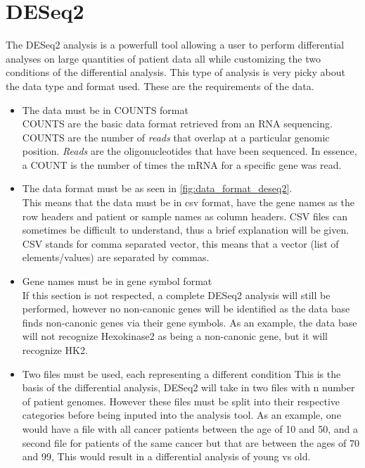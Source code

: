 \documentclass[11pt]{article}
\begin{document}
\section{DESeq2 \label{DESeq2}}
The DESeq2 analysis is a powerfull tool allowing a user to perform differential analyses on large quantities of patient data all while customizing the two conditions of the differential analysis. This type of analysis is very picky about the data type and format used. These are the requirements of the data.
\begin{itemize}
\item The data must be in COUNTS format\\
COUNTS are the basic data format retrieved from an RNA sequencing. COUNTS are the number of \textit{reads} that overlap at a particular genomic position. \textit{Reads} are the oligonucleotides that have been sequenced. In essence, a COUNT is the number of times the mRNA for a specific gene was read.
\item The data format must be as seen in \autoref{fig:data_format_deseq2}.\\
This means that the data must be in csv format, have the gene names as the row headers and patient or sample names as column headers.
CSV files can sometimes be difficult to understand, thus a brief explanation will be given. CSV stands for comma separated vector, this means that a vector (list of elements/values) are separated by commas.


\item Gene names must be in gene symbol format\\
If this section is not respected, a complete DESeq2 analysis will still be performed, however no non-canonic genes will be identified as the data base finds non-canonic genes via their gene symbols. As an example, the data base will not recognize Hexokinase2 as being a non-canonic gene, but it will recognize HK2.
\item Two files must be used, each representing a different condition
This is the basis of the differential analysis, DESeq2 will take in two files with n number of patient genomes. However these files must be split into their respective categories before being inputed into the analysis tool. As an example, one would have a file with all cancer patients between the age of 10 and 50, and a second file for patients of the same cancer but that are between the ages of 70 and 99, This would result in a differential analysis of young vs old.
\end{itemize}
\end{document}
